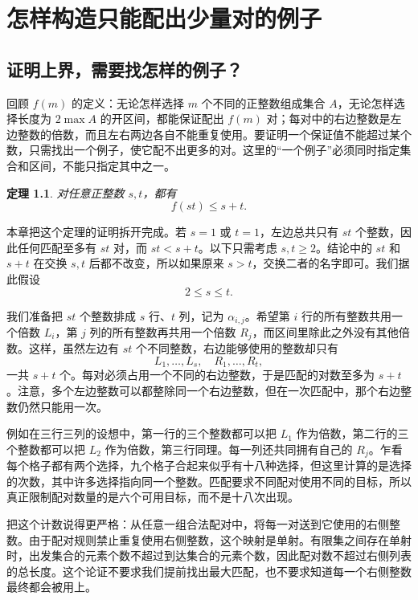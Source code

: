 \documentclass[UTF8,a4paper,oneside,openany,fontset=fandol,zihao=-4]{ctexbook}
\theoremstyle{guide}
\newtheorem{theorem}{定理}[chapter]
\begin{document}
\chapter{怎样构造只能配出少量对的例子}\label{up:chapter}

\section{证明上界，需要找怎样的例子？}\label{up:goal}

回顾 $f(m)$ 的定义：无论怎样选择 $m$ 个不同的正整数组成集合 $A$，无论怎样选择长度为 $2\max A$ 的开区间，都能保证配出 $f(m)$ 对；每对中的右边整数是左边整数的倍数，而且左右两边各自不能重复使用。要证明一个保证值不能超过某个数，只需找出一个例子，使它配不出更多的对。这里的“一个例子”必须同时指定集合和区间，不能只指定其中之一。

\begin{theorem}\label{thm:product-upper}
对任意正整数 $s,t$，都有
\[
f(st)\leq s+t.
\]
\end{theorem}

本章把这个定理的证明拆开完成。若 $s=1$ 或 $t=1$，左边总共只有 $st$ 个整数，因此任何匹配至多有 $st$ 对，而 $st<s+t$。以下只需考虑 $s,t\geq2$。结论中的 $st$ 和 $s+t$ 在交换 $s,t$ 后都不改变，所以如果原来 $s>t$，交换二者的名字即可。我们据此假设
\[
2\leq s\leq t.
\]

我们准备把 $st$ 个整数排成 $s$ 行、$t$ 列，记为 $\alpha_{i,j}$。希望第 $i$ 行的所有整数共用一个倍数 $L_i$，第 $j$ 列的所有整数再共用一个倍数 $R_j$，而区间里除此之外没有其他倍数。这样，虽然左边有 $st$ 个不同整数，右边能够使用的整数却只有
\[
L_1,\ldots,L_s,\quad R_1,\ldots,R_t,
\]
一共 $s+t$ 个。每对必须占用一个不同的右边整数，于是匹配的对数至多为 $s+t$。注意，多个左边整数可以都整除同一个右边整数，但在一次匹配中，那个右边整数仍然只能用一次。

例如在三行三列的设想中，第一行的三个整数都可以把 $L_1$ 作为倍数，第二行的三个整数都可以把 $L_2$ 作为倍数，第三行同理。每一列还共同拥有自己的 $R_j$。乍看每个格子都有两个选择，九个格子合起来似乎有十八种选择，但这里计算的是选择的次数，其中许多选择指向同一个整数。匹配要求不同配对使用不同的目标，所以真正限制配对数量的是六个可用目标，而不是十八次出现。

把这个计数说得更严格：从任意一组合法配对中，将每一对送到它使用的右侧整数。由于配对规则禁止重复使用右侧整数，这个映射是单射。有限集之间存在单射时，出发集合的元素个数不超过到达集合的元素个数，因此配对数不超过右侧列表的总长度。这个论证不要求我们提前找出最大匹配，也不要求知道每一个右侧整数最终都会被用上。
\end{document}
